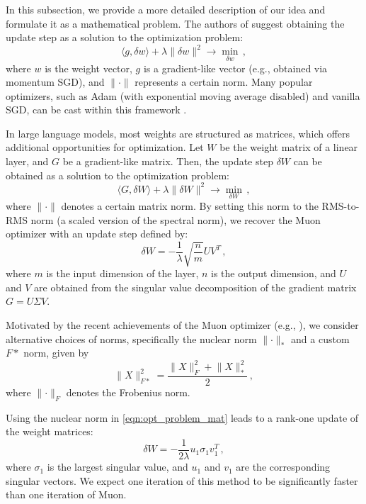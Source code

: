 \documentclass{article} %
\newcommand{\norm}[1]{\lVert #1\rVert}
\begin{document}
In this subsection, we provide a more detailed description of our idea and formulate it as a mathematical problem. The authors of \cite{bernstein2024oldoptimizernewnorm} suggest obtaining the update step as a solution to the optimization problem:
\begin{equation}
    \langle g, \delta w \rangle + \lambda \norm{\delta w}^2 \to \min_{\delta w}\,,
\end{equation}
where $w$ is the weight vector, $g$ is a gradient-like vector (e.g., obtained via momentum SGD), and $\norm{\cdot}$ represents a certain norm. Many popular optimizers, such as Adam (with exponential moving average disabled) and vanilla SGD, can be cast within this framework \cite{bernstein2024oldoptimizernewnorm}.

In large language models, most weights are structured as matrices, which offers additional opportunities for optimization. Let $W$ be the weight matrix of a linear layer, and $G$ be a gradient-like matrix. Then, the update step $\delta W$ can be obtained as a solution to the optimization problem:
\begin{equation}\label{eqn:opt_problem_mat}
  \langle G, \delta W \rangle + \lambda \norm{\delta W}^2 \to \min_{\delta W}\,,
\end{equation}
where $\norm{\cdot}$ denotes a certain matrix norm. By setting this norm to the RMS-to-RMS norm (a scaled version of the spectral norm), we recover the Muon optimizer \cite{bernstein2025deriving, bernstein2024oldoptimizernewnorm} with an update step defined by:
\begin{equation}\label{eqn:update_muon}
\delta W = - \frac{1}{\lambda}\sqrt{\frac{n}{m}}UV^T\,,
\end{equation}
where $m$ is the input dimension of the layer, $n$ is the output dimension, and $U$ and $V$ are obtained from the singular value decomposition of the gradient matrix $G = U \Sigma V$.

Motivated by the recent achievements of the Muon optimizer (e.g., \cite{liu2025muon}), we consider alternative choices of norms, specifically the nuclear norm $\norm{\cdot}_*$ and a custom $F*$ norm, given by 
\begin{equation}\label{eqn:F_star}
    \norm{X}_{F*}^2 = \frac{\norm{X}_F^2 + \norm{X}_*^2}{2}\,,
\end{equation}
where $\norm{\cdot}_F$ denotes the Frobenius norm.

Using the nuclear norm in \eqref{eqn:opt_problem_mat} leads to a rank-one update of the weight matrices:
\begin{equation}\label{eqn:update_star}
  \delta W = -\frac{1}{2\lambda} u_1 \sigma_1 v_1^T\,,
\end{equation}
where $\sigma_1$ is the largest singular value, and $u_1$ and $v_1$ are the corresponding singular vectors. We expect one iteration of this method to be significantly faster than one iteration of Muon.
\end{document}
